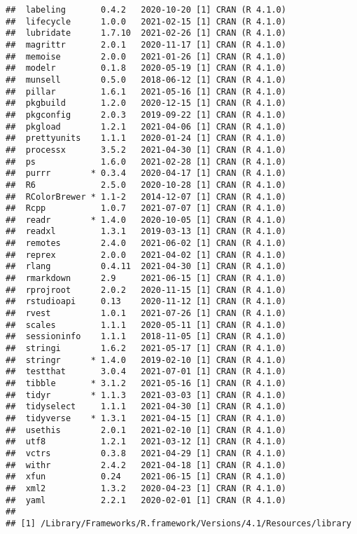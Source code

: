 \documentclass[
]{article}
\begin{document}
\begin{verbatim}
##  labeling       0.4.2   2020-10-20 [1] CRAN (R 4.1.0)
##  lifecycle      1.0.0   2021-02-15 [1] CRAN (R 4.1.0)
##  lubridate      1.7.10  2021-02-26 [1] CRAN (R 4.1.0)
##  magrittr       2.0.1   2020-11-17 [1] CRAN (R 4.1.0)
##  memoise        2.0.0   2021-01-26 [1] CRAN (R 4.1.0)
##  modelr         0.1.8   2020-05-19 [1] CRAN (R 4.1.0)
##  munsell        0.5.0   2018-06-12 [1] CRAN (R 4.1.0)
##  pillar         1.6.1   2021-05-16 [1] CRAN (R 4.1.0)
##  pkgbuild       1.2.0   2020-12-15 [1] CRAN (R 4.1.0)
##  pkgconfig      2.0.3   2019-09-22 [1] CRAN (R 4.1.0)
##  pkgload        1.2.1   2021-04-06 [1] CRAN (R 4.1.0)
##  prettyunits    1.1.1   2020-01-24 [1] CRAN (R 4.1.0)
##  processx       3.5.2   2021-04-30 [1] CRAN (R 4.1.0)
##  ps             1.6.0   2021-02-28 [1] CRAN (R 4.1.0)
##  purrr        * 0.3.4   2020-04-17 [1] CRAN (R 4.1.0)
##  R6             2.5.0   2020-10-28 [1] CRAN (R 4.1.0)
##  RColorBrewer * 1.1-2   2014-12-07 [1] CRAN (R 4.1.0)
##  Rcpp           1.0.7   2021-07-07 [1] CRAN (R 4.1.0)
##  readr        * 1.4.0   2020-10-05 [1] CRAN (R 4.1.0)
##  readxl         1.3.1   2019-03-13 [1] CRAN (R 4.1.0)
##  remotes        2.4.0   2021-06-02 [1] CRAN (R 4.1.0)
##  reprex         2.0.0   2021-04-02 [1] CRAN (R 4.1.0)
##  rlang          0.4.11  2021-04-30 [1] CRAN (R 4.1.0)
##  rmarkdown      2.9     2021-06-15 [1] CRAN (R 4.1.0)
##  rprojroot      2.0.2   2020-11-15 [1] CRAN (R 4.1.0)
##  rstudioapi     0.13    2020-11-12 [1] CRAN (R 4.1.0)
##  rvest          1.0.1   2021-07-26 [1] CRAN (R 4.1.0)
##  scales         1.1.1   2020-05-11 [1] CRAN (R 4.1.0)
##  sessioninfo    1.1.1   2018-11-05 [1] CRAN (R 4.1.0)
##  stringi        1.6.2   2021-05-17 [1] CRAN (R 4.1.0)
##  stringr      * 1.4.0   2019-02-10 [1] CRAN (R 4.1.0)
##  testthat       3.0.4   2021-07-01 [1] CRAN (R 4.1.0)
##  tibble       * 3.1.2   2021-05-16 [1] CRAN (R 4.1.0)
##  tidyr        * 1.1.3   2021-03-03 [1] CRAN (R 4.1.0)
##  tidyselect     1.1.1   2021-04-30 [1] CRAN (R 4.1.0)
##  tidyverse    * 1.3.1   2021-04-15 [1] CRAN (R 4.1.0)
##  usethis        2.0.1   2021-02-10 [1] CRAN (R 4.1.0)
##  utf8           1.2.1   2021-03-12 [1] CRAN (R 4.1.0)
##  vctrs          0.3.8   2021-04-29 [1] CRAN (R 4.1.0)
##  withr          2.4.2   2021-04-18 [1] CRAN (R 4.1.0)
##  xfun           0.24    2021-06-15 [1] CRAN (R 4.1.0)
##  xml2           1.3.2   2020-04-23 [1] CRAN (R 4.1.0)
##  yaml           2.2.1   2020-02-01 [1] CRAN (R 4.1.0)
## 
## [1] /Library/Frameworks/R.framework/Versions/4.1/Resources/library
\end{verbatim}
\end{document}
